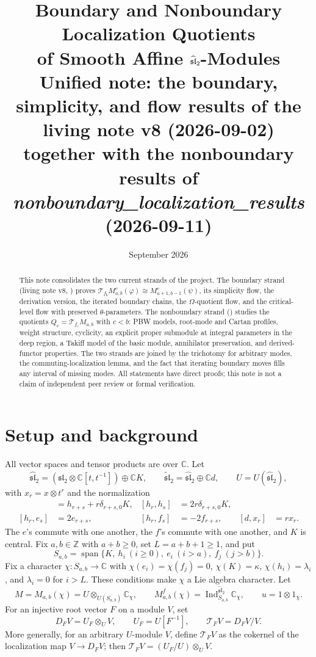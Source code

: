 \documentclass[11pt,a4paper]{article}
\title{\vspace{-14mm}Boundary and Nonboundary Localization Quotients\\
of Smooth Affine \(\slh\)-Modules\\[3pt]
\large Unified note: the boundary, simplicity, and flow results of the living note v8 (2026-09-02)\\
together with the nonboundary results of \emph{nonboundary\_localization\_results} (2026-09-11)}
\author{}
\date{September 2026}
\newcommand{\C}{\mathbb C}
\newcommand{\Z}{\mathbb Z}
\newcommand{\slc}{\mathfrak{sl}_2}
\newcommand{\slh}{\widehat{\mathfrak{sl}}_2}
\newcommand{\slt}{\widetilde{\mathfrak{sl}}_2}
\newcommand{\Ind}{\operatorname{Ind}}
\newcommand{\Span}{\operatorname{span}}
\newcommand{\T}{\mathcal T}
\theoremstyle{plainupright}
\begin{document}
\maketitle
\vspace{-9mm}
\begin{abstract}
This note consolidates the two current strands of the project. The boundary
strand (living note v8, \cite{LivingV8}) proves
\(\T_{f_b}M^c_{a,b}(\varphi)\cong M^c_{a+1,b-1}(\psi)\), its simplicity flow,
the derivation version, the iterated boundary chains, the \(\Omega\)-quotient
flow, and the critical-level flow with preserved \(\theta\)-parameters. The
nonboundary strand (\cite{Nonboundary}) studies the quotients
\(Q_c=\T_{f_c}M_{a,b}\) with \(c<b\): PBW models, root-mode and Cartan
profiles, weight structure, cyclicity, an explicit proper submodule at
integral parameters in the deep region, a Takiff model of the basic module,
annihilator preservation, and derived-functor properties. The two strands are
joined by the trichotomy for arbitrary modes, the commuting-localization
lemma, and the fact that iterating boundary moves fills any interval of
missing modes. All statements have direct proofs; this note is not a claim of
independent peer review or formal verification.
\end{abstract}

\section{Setup and background}\label{sec:setup}

All vector spaces and tensor products are over \(\C\). Let
\[
\slh=(\slc\otimes\C[t,t^{-1}])\oplus\C K,\qquad
\slt=\slh\oplus\C d,\qquad U=U(\slh),
\]
with \(x_r=x\otimes t^r\) and the normalization
\begin{align*}
[e_r,f_s]&=h_{r+s}+r\delta_{r+s,0}K,&
[h_r,h_s]&=2r\delta_{r+s,0}K,\\
[h_r,e_s]&=2e_{r+s},&
[h_r,f_s]&=-2f_{r+s},&
[d,x_r]&=rx_r.
\end{align*}
The \(e\)'s commute with one another, the \(f\)'s commute with one another,
and \(K\) is central. Fix \(a,b\in\Z\) with \(a+b\ge0\), set \(L=a+b+1\ge1\),
and put
\[
S_{a,b}=\Span\{K,\ h_i\ (i\ge0),\ e_i\ (i>a),\ f_j\ (j>b)\}.
\]
Fix a character \(\chi:S_{a,b}\to\C\) with \(\chi(e_i)=\chi(f_j)=0\),
\(\chi(K)=\kappa\), \(\chi(h_i)=\lambda_i\), and \(\lambda_i=0\) for \(i>L\).
These conditions make \(\chi\) a Lie algebra character. Let
\[
M=M_{a,b}(\chi)=U\otimes_{U(S_{a,b})}\C_\chi,\qquad
M^f_{a,b}(\chi)=\Ind_{S_{a,b}}^{\slt}\C_\chi,\qquad u=1\otimes1_\chi.
\]
For an injective root vector \(F\) on a module \(V\), set
\[
D_FV=U_F\otimes_UV,\qquad U_F=U[F^{-1}],\qquad
\T_FV=D_FV/V.
\]
More generally, for an arbitrary \(U\)-module \(V\), define
\(\T_FV\) as the cokernel of the localization map \(V\to D_FV\); then
\(\T_FV=(U_F/U)\otimes_UV\).
\end{document}
